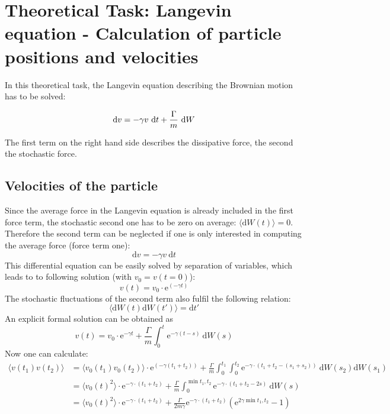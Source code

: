 \documentclass[12pt,a4paper]{scrartcl}
\begin{document}
\section{Theoretical Task: Langevin equation - Calculation of particle
positions and velocities}
In this theoretical task, the Langevin equation describing the Brownian motion has to be solved:

\begin{equation}
	\text{d}v = - \gamma v \text ~ \text{d}t + \frac{\Gamma}{m}~\text{d}W
\end{equation}

The first term on the right hand side describes the dissipative force, the second the stochastic force.

\subsection{Velocities of the particle}
Since the average force in the Langevin equation is already included in the first force term, the stochastic second one has to be zero on average: $\langle \text{d}W(t) \rangle = 0$. Therefore the second term can be neglected if one is only interested in computing the average force (force term one):
\begin{equation}
	\text{d} v = - \gamma v ~ \text{d} t
\end{equation}
This differential equation can be easily solved by separation of variables, which leads to to following solution (with $v_0 = v(t=0)$):
\begin{equation} 
	v(t) = v_0 \cdot \text{e}^{(-\gamma t)}
\end{equation}
The stochastic fluctuations of the second term also fulfil the following relation:
\begin{equation}
	\langle\text{d}W(t)\text{d}W(t')\rangle = \text{d}t'
\end{equation}
An explicit formal solution can be obtained as
\begin{equation}
	v(t) = v_0 \cdot \text{e}^{-\gamma t} + \frac{\Gamma}{m} \int_0^t \text{e}^ {-\gamma(t-s)}~\text{d}W(s)
\end{equation}
Now one can calculate:
\begin{align}
	\langle v(t_1)v(t_2) \rangle &= \langle v_0(t_1) v_0(t_2)\rangle \cdot \text{e}^{(-\gamma (t_1+t_2))}
 + \frac{\Gamma}{m} \int_0^{t_1} \int_0^{t_2} \text{e}^ {-\gamma\cdot(t_1+t_2-(s_1+s_2))}~\text{d}W(s_2)\text{d}W(s_1)\\
	&= \langle v_0(t)^2\rangle \cdot \text{e}^{-\gamma\cdot (t_1+t_2)}	
	 + \frac{\Gamma}{m} \int_0^{\min{t_1, t_2}} \text{e}^ {-\gamma\cdot(t_1+t_2-2s)}~\text{d}W(s)\\
	&= \langle v_0(t)^2\rangle \cdot \text{e}^{-\gamma\cdot (t_1+t_2)}+ \frac{\Gamma}{2 m\gamma} \text{e}^ {-\gamma\cdot(t_1+t_2)}\left( \text{e}^ {2\gamma \min{t_1, t_2}} - 1 \right)
\end{align}
\end{document}
